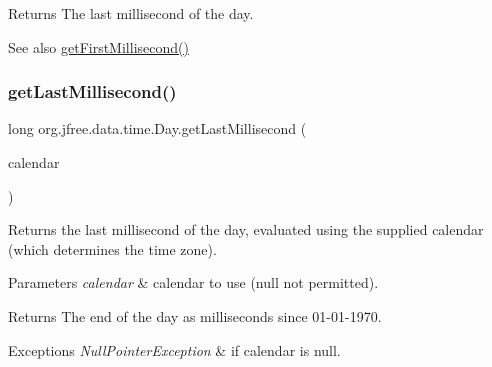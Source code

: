 \begin{DoxyReturn}{Returns}
The last millisecond of the day.
\end{DoxyReturn}
\begin{DoxySeeAlso}{See also}
\mbox{\hyperlink{classorg_1_1jfree_1_1data_1_1time_1_1_day_a749a1d827eea6ad8374db0746d87e30b}{get\+First\+Millisecond()}} 
\end{DoxySeeAlso}
\mbox{\label{classorg_1_1jfree_1_1data_1_1time_1_1_day_a3949f4dc9d25051075139dd021a530ec}} 
\subsubsection{\texorpdfstring{get\+Last\+Millisecond()}{getLastMillisecond()}\hspace{0.1cm}{\footnotesize\ttfamily [2/2]}}
{\footnotesize\ttfamily long org.\+jfree.\+data.\+time.\+Day.\+get\+Last\+Millisecond (\begin{DoxyParamCaption}\item[{Calendar}]{calendar }\end{DoxyParamCaption})}

Returns the last millisecond of the day, evaluated using the supplied calendar (which determines the time zone).


\begin{DoxyParams}{Parameters}
{\em calendar} & calendar to use ({\ttfamily null} not permitted).\\
\hline
\end{DoxyParams}
\begin{DoxyReturn}{Returns}
The end of the day as milliseconds since 01-\/01-\/1970.
\end{DoxyReturn}

\begin{DoxyExceptions}{Exceptions}
{\em Null\+Pointer\+Exception} & if {\ttfamily calendar} is {\ttfamily null}. \\
\hline
\end{DoxyExceptions}
\mbox{\label{classorg_1_1jfree_1_1data_1_1time_1_1_day_a3c9bed548d3c21a2db9e2bf8f6b44539}} 

